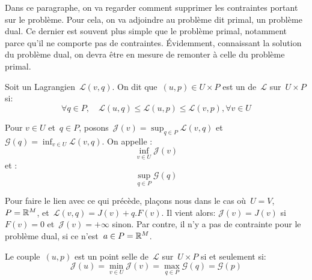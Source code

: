 Dans ce paragraphe, on va regarder comment supprimer les contraintes portant sur le problème. Pour cela, on va adjoindre au problème dit primal, un problème dual. Ce dernier est souvent plus simple que le problème primal, notamment parce qu'il ne comporte pas de contraintes. Évidemment, connaissant la solution du problème dual, on devra être en mesure de remonter à celle du problème primal.

\begin{definition}
Soit un Lagrangien~$\mathcal{L}(v,q)$.
On dit que~$(u,p)\in U\times P$ est un  de~$\mathcal{L}$ sur~$U\times P$ si:
\begin{equation}
\forall q\in P, \quad \mathcal{L}(u,q) \le \mathcal{L}(u,p) \le \mathcal{L}(v,p), \forall v\in U
\end{equation}

Pour $v\in U$ et~$q\in P$, posons~$\mathcal{J}(v)=\sup_{q\in P}\mathcal{L}(v,q)$ et~$\mathcal{G}(q)=\inf_{v\in U}\mathcal{L}(v,q)$.
On appelle :
\begin{equation}
\inf_{v\in U} \mathcal{J}(v)
\end{equation}
et :
\begin{equation}
\sup_{q\in P} \mathcal{G}(q)
\end{equation}
\end{definition}

Pour faire le lien avec ce qui précède, plaçons nous dans le cas où~$U=V$, $P=\mathbb R^M$, et~$\mathcal{L}(v,q)=J(v)+q.F(v)$.
Il vient alors: $\mathcal{J}(v)=J(v)$ si~$F(v)=0$ et~$\mathcal{J}(v)=+\infty$ sinon.
Par contre, il n'y a pas de contrainte pour le problème dual, si ce n'est~$a\in P=\mathbb R^M$.


\begin{theoreme}
Le couple~$(u,p)$ est un point selle de~$\mathcal{L}$ sur~$U\times P$ si et seulement si:
\begin{equation}
\mathcal{J}(u)=\min_{v\in U}\mathcal{J}(v) = \max_{q\in P}\mathcal{G}(q)=\mathcal{G}(p)
\end{equation}
\end{theoreme}



